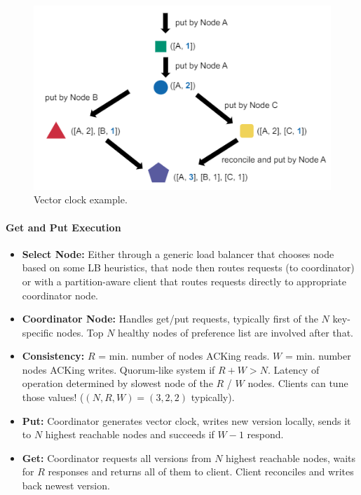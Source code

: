 
\begin{figure}[h]
	\centering
	\includegraphics[scale=0.8]{images/2-vectorclock.PNG}
	\caption{Vector clock example.}
	\label{fig:vclock}
\end{figure}


\paragraph{Get and Put Execution}
\begin{itemize}
    \item \textbf{Select Node:} Either through a generic load balancer that chooses node based on some LB heuristics, that node then routes requests (to coordinator) or with a partition-aware client that routes requests directly to appropriate coordinator node. 
    \item \textbf{Coordinator Node:} Handles get/put requests, typically first of the $N$ key-specific nodes. Top $N$ healthy nodes of preference list are involved after that.
    \item \textbf{Consistency:} $R$ = min. number of nodes ACKing reads. $W$ = min. number nodes ACKing writes. Quorum-like system if $R + W > N$. Latency of operation determined by slowest node of the $R$ / $W$ nodes. Clients can tune those values! ($(N, R, W) = (3, 2, 2)$ typically).
    \item \textbf{Put:} Coordinator generates vector clock, writes new version locally, sends it to $N$ highest reachable nodes and succeeds if $W-1$ respond.
    \item \textbf{Get:} Coordinator requests all versions from $N$ highest reachable nodes, waits for $R$ responses and returns all of them to client. Client reconciles and writes back newest version.
\end{itemize}

